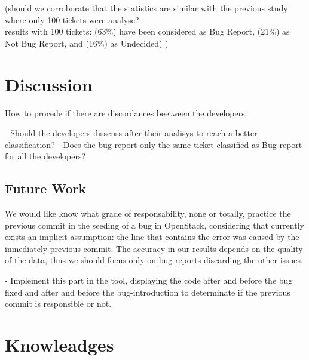 \documentclass[ifip]{svmult}
\begin{document}
(should we corroborate that the statistics are similar with the previous study where only 100 tickets were analyse?\\
results with 100 tickets: (63\%) have been considered as Bug Report, (21\%) as Not Bug Report, and (16\%) as Undecided) 
)

\section{Discussion}
\label{sec:5}
How to procede if there are discordances beetween the developers:

- Should the developers disscuss after their analisys to reach a better classification?
- Does the bug report only the same ticket classified as Bug report for all the developers?

\subsection{Future Work}
\label{sec:5.1}

We would like know what grade of responsability, none or totally, practice the previous commit in the seeding of a bug in OpenStack, considering that currently exists an implicit assumption: the line that contains the error was caused by the inmediately previous commit\cite{Sliwerski}. The accuracy in our results depends on the quality of the data, thus we should focus only on bug reports discarding the other issues.

- Implement this part in the tool, displaying the code after and before the bug fixed and after and before the bug-introduction to determinate if the previous commit is responsible or not.

\section{Knowleadges}
\label{sec:6}




\end{document}
